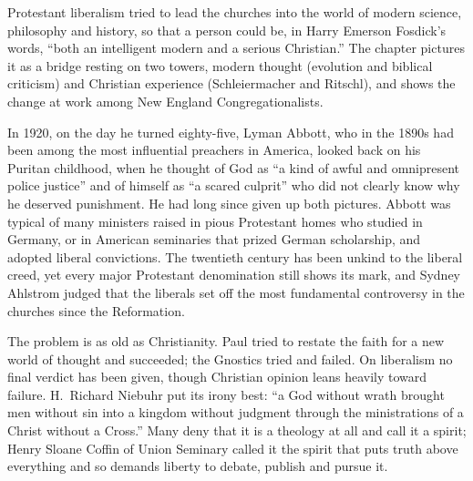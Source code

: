 
\begin{inbrief}
Protestant liberalism tried to lead the churches into the world of modern science, philosophy and
history, so that a person could be, in Harry Emerson Fosdick's words, ``both an intelligent modern
and a serious Christian.'' The chapter pictures it as a bridge resting on two towers, modern thought
(evolution and biblical criticism) and Christian experience (Schleiermacher and Ritschl), and shows
the change at work among New England Congregationalists.
\end{inbrief}

In 1920, on the day he turned eighty-five, Lyman Abbott, who in the 1890s had been among the most influential preachers in America, looked back on his Puritan childhood, when he thought of God as ``a kind of awful and
omnipresent police justice'' and of himself as ``a scared culprit'' who did not clearly know why he
deserved punishment. He had long since given up both pictures. Abbott was typical of many ministers
raised in pious Protestant homes who studied in Germany, or in American seminaries that prized German
scholarship, and adopted liberal convictions. The twentieth century has been unkind to the liberal
creed, yet every major Protestant denomination still shows its mark, and Sydney Ahlstrom judged that
the liberals set off the most fundamental controversy in the churches since the Reformation.

The problem is as old as Christianity. Paul tried to restate the faith for a new world of thought and
succeeded; the Gnostics tried and failed. On liberalism no final verdict has been given, though Christian
opinion leans heavily toward failure. H.~Richard Niebuhr put its irony best: ``a God without wrath
brought men without sin into a kingdom without judgment through the ministrations of a Christ without
a Cross.'' Many deny that it is a theology at all and call it a spirit; Henry Sloane Coffin of Union
Seminary called it the spirit that puts truth above everything and so demands liberty to debate,
publish and pursue it.

